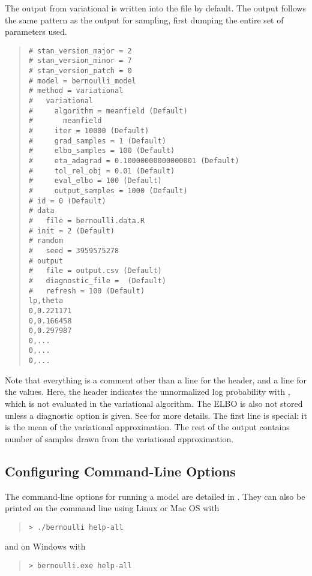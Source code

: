 The output from variational is written into the file
 by default.  The output follows the same pattern as the
output for sampling, first dumping the entire set of parameters used.
%
\begin{quote}
\begin{Verbatim}[fontsize=\small]
# stan_version_major = 2
# stan_version_minor = 7
# stan_version_patch = 0
# model = bernoulli_model
# method = variational
#   variational
#     algorithm = meanfield (Default)
#       meanfield
#     iter = 10000 (Default)
#     grad_samples = 1 (Default)
#     elbo_samples = 100 (Default)
#     eta_adagrad = 0.10000000000000001 (Default)
#     tol_rel_obj = 0.01 (Default)
#     eval_elbo = 100 (Default)
#     output_samples = 1000 (Default)
# id = 0 (Default)
# data
#   file = bernoulli.data.R
# init = 2 (Default)
# random
#   seed = 3959575278
# output
#   file = output.csv (Default)
#   diagnostic_file =  (Default)
#   refresh = 100 (Default)
lp,theta
0,0.221171
0,0.166458
0,0.297987
0,...
0,...
0,...
\end{Verbatim}
\end{quote}
%
Note that everything is a comment other than a line for the header,
and a line for the values.  Here, the header indicates the
unnormalized log probability with , which is not evaluated
in the variational algorithm. The ELBO is also not stored unless a diagnostic
option is given. See  for more details.
The first line is special: it is the mean of the variational approximation.
The rest of the output contains  number of samples
drawn from the variational approximation.

\subsection{Configuring Command-Line Options}

The command-line options for running a model are detailed in
. They can also be printed on the command line
using Linux or Mac OS with
%
\begin{quote}
\begin{Verbatim}[fontshape=sl]
> ./bernoulli help-all
\end{Verbatim}
\end{quote}
%
and on Windows with
%
\begin{quote}
\begin{Verbatim}[fontshape=sl]
> bernoulli.exe help-all
\end{Verbatim}
\end{quote}
%


